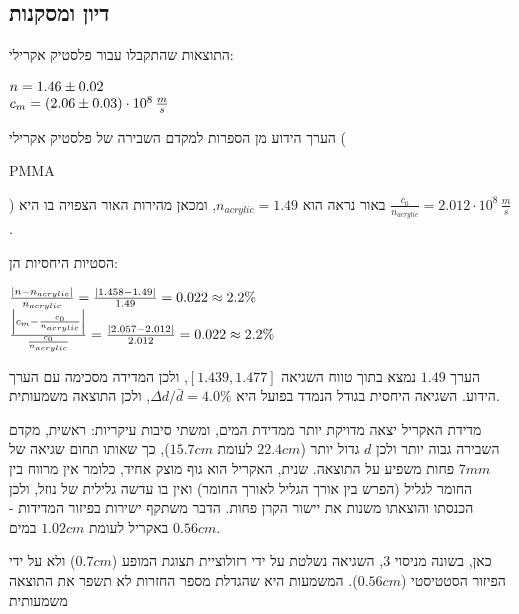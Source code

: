 \documentclass[14pt]{extarticle}
\makeatletter
\newenvironment{lefteqs}{%
    \begin{english}%
    \begin{flushleft}%
    \renewcommand{\arraystretch}{1.3}%
    $\begin{array}{@{}l@{}}%
}{%
    \end{array}$%
    \end{flushleft}%
    \end{english}%
}
\makeatother
\begin{document}
\subsection*{דיון ומסקנות}

התוצאות שהתקבלו עבור פלסטיק אקרילי:
\begin{lefteqs}
    n = 1.46 \pm 0.02 \\
    c_m = (2.06 \pm 0.03) \cdot 10^8\,\frac{m}{s}
\end{lefteqs}

הערך הידוע מן הספרות למקדם השבירה של פלסטיק אקרילי (\begin{english}PMMA\end{english}) באור נראה הוא
$n_{acrylic} = 1.49$, ומכאן מהירות האור הצפויה בו היא $\frac{c_0}{n_{acrylic}} = 2.012 \cdot 10^8\,\frac{m}{s}$.

הסטיות היחסיות הן:
\begin{lefteqs}
    \frac{\left| n - n_{acrylic} \right|}{n_{acrylic}} = \frac{\left| 1.458 - 1.49 \right|}{1.49} = 0.022 \approx 2.2\% \\
    \frac{\left| c_m - \frac{c_0}{n_{acrylic}} \right|}{\frac{c_0}{n_{acrylic}}} = \frac{\left| 2.057 - 2.012 \right|}{2.012} = 0.022 \approx 2.2\%
\end{lefteqs}

הערך $1.49$ נמצא בתוך טווח השגיאה $[1.439, 1.477]$, ולכן המדידה מסכימה עם הערך הידוע.
השגיאה היחסית בגודל הנמדד בפועל היא $\Delta d / \bar{d} = 4.0\%$, ולכן התוצאה משמעותית.

מדידת האקריל יצאה מדויקת יותר ממדידת המים, ומשתי סיבות עיקריות:
ראשית, מקדם השבירה גבוה יותר ולכן $d$ גדול יותר ($22.4cm$ לעומת $15.7cm$), כך שאותו תחום שגיאה של
$7mm$ פחות משפיע על התוצאה. שנית, האקריל הוא גוף מוצק אחיד, כלומר אין מרווח בין החומר לגליל (הפרש בין אורך הגליל לאורך החומר) ואין בו
עדשה גלילית של נוזל, ולכן הכנסתו והוצאתו משנות את יישור הקרן פחות. הדבר משתקף ישירות בפיזור
המדידות - $0.56cm$ באקריל לעומת $1.02cm$ במים.

כאן, בשונה מניסוי 3, השגיאה נשלטת על ידי רזולוציית תצוגת המופע ($0.7cm$)
ולא על ידי הפיזור הסטטיסטי ($0.56cm$). המשמעות היא שהגדלת מספר החזרות לא תשפר את התוצאה משמעותית
\end{document}

